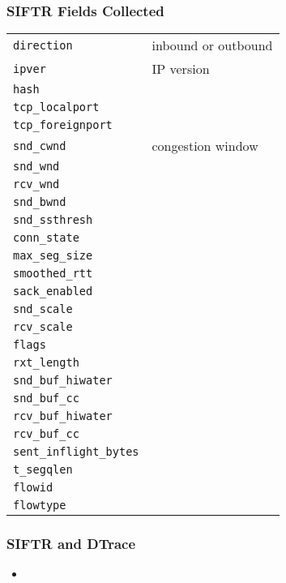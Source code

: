 \documentclass[pdftex]{beamer}
\begin{document}
\begin{frame}[fragile]
  \frametitle{SIFTR Fields Collected}
  \begin{tabular*}{1.0\linewidth}{|l|l|}
    \verb|direction| & inbound or outbound \\
    \verb|ipver| & IP version \\
    \verb|hash| & \\
    \verb|tcp_localport| & \\
    \verb|tcp_foreignport| & \\
    \verb|snd_cwnd| & congestion window \\
    \verb|snd_wnd| & \\
    \verb|rcv_wnd| & \\
    \verb|snd_bwnd| & \\
    \verb|snd_ssthresh| & \\
    \verb|conn_state| & \\
    \verb|max_seg_size| & \\
    \verb|smoothed_rtt | & \\
    \verb|sack_enabled| & \\
    \verb|snd_scale| & \\
    \verb|rcv_scale| & \\
    \verb|flags| & \\
    \verb|rxt_length| & \\
    \verb|snd_buf_hiwater| & \\
    \verb|snd_buf_cc| & \\
    \verb|rcv_buf_hiwater| & \\
    \verb|rcv_buf_cc| & \\
    \verb|sent_inflight_bytes| & \\
    \verb|t_segqlen| & \\
    \verb|flowid| & \\
    \verb|flowtype| & 
  \end{tabular*}
\end{frame}

\begin{frame}
  \frametitle{SIFTR and DTrace}
  \begin{itemize}
  \item 
  \end{itemize}
\end{frame}
\end{document}
